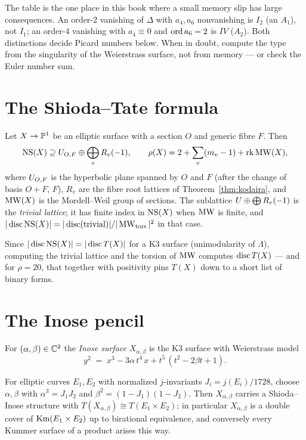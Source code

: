 \begin{warning}
The table is the one place in this book where a small memory slip has large
consequences. An order-$2$ vanishing of $\Delta$ with $a_4,a_6$ nonvanishing
is $I_2$ (an $A_1$), not $I_1$; an order-$4$ vanishing with $a_4\equiv0$ and
$\operatorname{ord} a_6=2$ is $IV$ ($A_2$). Both distinctions decide Picard numbers below.
When in doubt, compute the type from the singularity of the Weierstrass
surface, not from memory --- or check the Euler number sum.
\end{warning}

\section{The Shioda--Tate formula}

\begin{theorem}\label{thm:shioda-tate}
Let $X\to\mathbb{P}^1$ be an elliptic surface with a section $O$ and generic fibre
$F$. Then
\[
  \operatorname{NS}(X)\supseteq U_{O,F}\oplus\bigoplus_v R_v(-1),\qquad
  \rho(X)=2+\sum_v (m_v-1)+\operatorname{rk}\operatorname{MW}(X),
\]
where $U_{O,F}$ is the hyperbolic plane spanned by $O$ and $F$ (after the
change of basis $O+F$, $F$), $R_v$ are the fibre root lattices of
Theorem~\ref{thm:kodaira}, and $\operatorname{MW}(X)$ is the Mordell--Weil group of sections.
The sublattice $U\oplus\bigoplus R_v(-1)$ is the \emph{trivial lattice}; it
has finite index in $\operatorname{NS}(X)$ when $\operatorname{MW}$ is finite, and
$|\operatorname{disc}\operatorname{NS}(X)|=|\operatorname{disc}(\text{trivial})|/|\operatorname{MW}_{\mathrm{tors}}|^2$ in that case.
\end{theorem}

Since $|\operatorname{disc}\operatorname{NS}(X)|=|\operatorname{disc} T(X)|$ for a K3 surface (unimodularity of
$\Lambda$), computing the trivial lattice and the torsion of $\operatorname{MW}$ computes
$\operatorname{disc} T(X)$ --- and for $\rho=20$, that together with positivity pins $T(X)$
down to a short list of binary forms.

\section{The Inose pencil}\label{sec:inose}

\begin{definition}
For $(\alpha,\beta)\in\mathbb{C}^2$ the \emph{Inose surface} $X_{\alpha,\beta}$ is the
K3 surface with Weierstrass model
\[
  y^2 \;=\; x^3-3\alpha\,t^4\,x+t^5\,(t^2-2\beta t+1).
\]
\end{definition}

\begin{theorem}\label{thm:inose}
For elliptic curves $E_1,E_2$ with normalized $j$-invariants $J_i=j(E_i)/1728$,
choose $\alpha,\beta$ with $\alpha^3=J_1J_2$ and $\beta^2=(1-J_1)(1-J_2)$.
Then $X_{\alpha,\beta}$ carries a Shioda--Inose structure with
$T(X_{\alpha,\beta})\cong T(E_1\times E_2)$; in particular
$X_{\alpha,\beta}$ is a double cover of $\operatorname{Km}(E_1\times E_2)$ up to birational
equivalence, and conversely every Kummer surface of a product arises this way.
\end{theorem}

